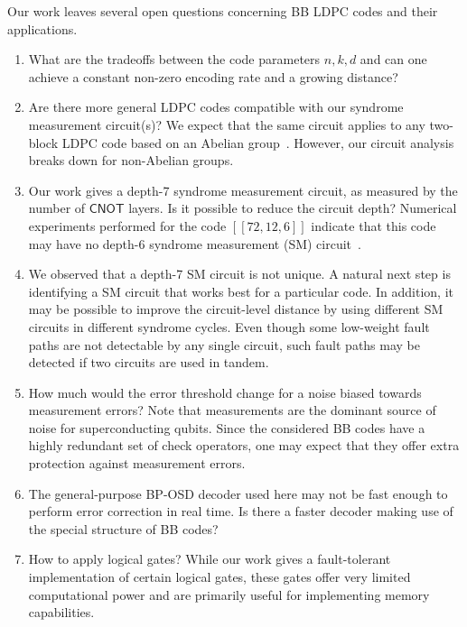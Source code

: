 \documentclass{article}
\newcommand{\Gate}[1]{\mathsf{#1}}
\newcommand{\cnotgate}{\Gate{CNOT}}
\begin{document}
Our work leaves several open questions concerning BB LDPC codes and their applications. 
\begin{enumerate}
\item  What are the tradeoffs between the code parameters $n,k,d$ and can one achieve a constant non-zero encoding rate and a growing distance? 
\item  Are there more general LDPC codes compatible with our syndrome measurement circuit(s)? We expect that the same circuit applies to any two-block LDPC code  based on an Abelian group~\cite{lin2023quantum,wang2023abelian}. However, our circuit analysis breaks down 
for non-Abelian groups. 
\item  Our work gives a depth-7 syndrome measurement circuit,  as measured by the number of $\cnotgate$ layers. Is it possible to reduce the circuit depth? Numerical experiments performed for the code $[[72,12,6]]$ indicate that this code may have no depth-6 syndrome measurement (SM) circuit~\cite{AlexanderPrivateComm}. 

\item We observed that a depth-7 SM circuit is not unique.
A natural next step is 
identifying a SM circuit that works best for a particular code.
In addition, it may be possible to improve the circuit-level distance by
using different SM circuits in different syndrome cycles.
Even though some low-weight fault paths are not detectable by any single circuit, such fault paths may be detected if two circuits are used in tandem.


\item How much would the error threshold change for a noise biased towards measurement errors? Note that measurements are  the dominant source of noise for superconducting qubits. Since the considered BB codes have a highly redundant set of check operators, one may expect that they offer extra protection against measurement errors. 
\item The general-purpose BP-OSD decoder used here may not be fast enough to perform error correction in real time. Is there a faster decoder making use of the special structure of BB codes? 
\item How to apply logical gates? While our work gives a fault-tolerant implementation of certain logical gates, these gates offer very limited computational power and are primarily useful for implementing memory capabilities. 
\end{enumerate}
\end{document}
